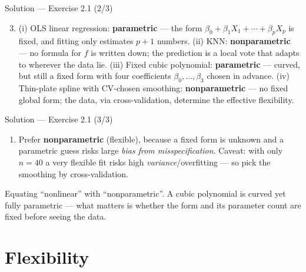\documentclass[aspectratio=169,11pt]{beamer}
\begin{document}
\begin{frame}{Solution --- Exercise 2.1 (2/3)}
\begin{solutionbox}
\begin{enumerate}\setcounter{enumi}{2}
  \item (i) OLS linear regression: \textbf{parametric} --- the form
        $\beta_0+\beta_1X_1+\cdots+\beta_pX_p$ is fixed, and fitting
        only estimates $p+1$ numbers.
        (ii) KNN: \textbf{nonparametric} --- no formula for $f$ is
        written down; the prediction is a local vote that adapts to
        wherever the data lie.
        (iii) Fixed cubic polynomial: \textbf{parametric} --- curved,
        but still a fixed form with four coefficients
        $\beta_0,\ldots,\beta_3$ chosen in advance.
        (iv) Thin-plate spline with CV-chosen smoothing:
        \textbf{nonparametric} --- no fixed global form; the data,
        via cross-validation, determine the effective flexibility.
  \end{enumerate}
\end{solutionbox}
\end{frame}

\begin{frame}{Solution --- Exercise 2.1 (3/3)}
\begin{solutionbox}
  \begin{enumerate}
  \item Prefer \textbf{nonparametric} (flexible), because a fixed form
        is unknown and a parametric guess risks large
        \emph{bias from misspecification}. Caveat: with only $n=40$ a
        very flexible fit risks high \emph{variance}/overfitting --- so
        pick the smoothing by cross-validation.
\end{enumerate}
\end{solutionbox}
\begin{mistake}
Equating ``nonlinear'' with
``nonparametric''. A cubic polynomial is curved yet fully parametric
--- what matters is whether the form and its parameter count are fixed
before seeing the data.
\end{mistake}
\end{frame}


\section{Flexibility}
\end{document}

